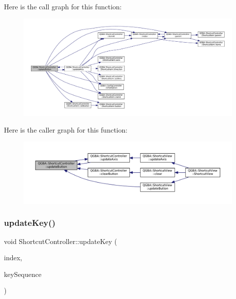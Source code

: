 Here is the call graph for this function\+:
\nopagebreak
\begin{figure}[H]
\begin{center}
\leavevmode
\includegraphics[width=350pt]{class_q_g_b_a_1_1_shortcut_controller_a1f49dde502461ba467e49d81c458271b_cgraph}
\end{center}
\end{figure}
Here is the caller graph for this function\+:
\nopagebreak
\begin{figure}[H]
\begin{center}
\leavevmode
\includegraphics[width=350pt]{class_q_g_b_a_1_1_shortcut_controller_a1f49dde502461ba467e49d81c458271b_icgraph}
\end{center}
\end{figure}
\mbox{\label{class_q_g_b_a_1_1_shortcut_controller_a5a3035a01274244bff7fffe1a09aaf58}} 
\subsubsection{\texorpdfstring{update\+Key()}{updateKey()}\hspace{0.1cm}{\footnotesize\ttfamily [1/2]}}
{\footnotesize\ttfamily void Shortcut\+Controller\+::update\+Key (\begin{DoxyParamCaption}\item[{const Q\+Model\+Index \&}]{index,  }\item[{\mbox{\hyperlink{ioapi_8h_a787fa3cf048117ba7123753c1e74fcd6}{int}}}]{key\+Sequence }\end{DoxyParamCaption})}

